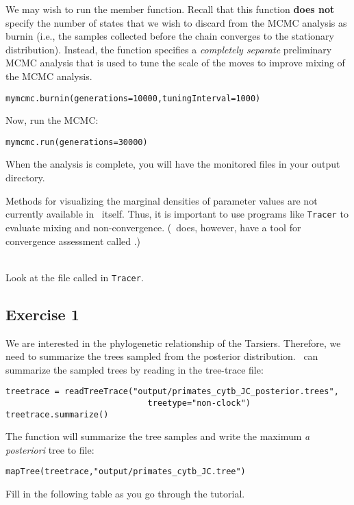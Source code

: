 We may wish to run the  member function.
Recall that this function \textbf{does not} specify the number of states that we wish to discard from the MCMC analysis as burnin (i.e., the samples collected before the chain converges to the stationary distribution).  
Instead, the  function specifies a \textit{completely separate} preliminary MCMC analysis that is used to tune the scale of the moves to improve mixing of the MCMC analysis.
{\tt \begin{snugshade*}
\begin{lstlisting}
mymcmc.burnin(generations=10000,tuningInterval=1000)
\end{lstlisting}
\end{snugshade*}}


Now, run the MCMC:
{\tt \begin{snugshade*}
\begin{lstlisting}
mymcmc.run(generations=30000)
\end{lstlisting}
\end{snugshade*}}

When the analysis is complete, you will have the monitored files in your output directory.


Methods for visualizing the marginal densities of parameter values are not currently available in \RevBayes~itself. 
Thus, it is important to use programs like \texttt{Tracer} \citep{Rambaut2011} to evaluate mixing and non-convergence. (\RevBayes~does, however, have a tool for convergence assessment called .)

\noindent \\ \impmark Look at the file called  in \texttt{Tracer}.


\subsection{Exercise 1}

We are interested in the phylogenetic relationship of the Tarsiers. Therefore, we need to summarize the trees sampled from the posterior distribution.
\RevBayes~can summarize the sampled trees by reading in the tree-trace file:
{\tt \begin{snugshade*}
\begin{lstlisting}
treetrace = readTreeTrace("output/primates_cytb_JC_posterior.trees",
                             treetype="non-clock")
treetrace.summarize()
\end{lstlisting}
\end{snugshade*}}
The  function will summarize the tree samples and write the maximum \textit{a posteriori} tree to file:
{\tt \begin{snugshade*}
\begin{lstlisting}
mapTree(treetrace,"output/primates_cytb_JC.tree")
\end{lstlisting}
\end{snugshade*}}
Fill in the following table as you go through the tutorial.

